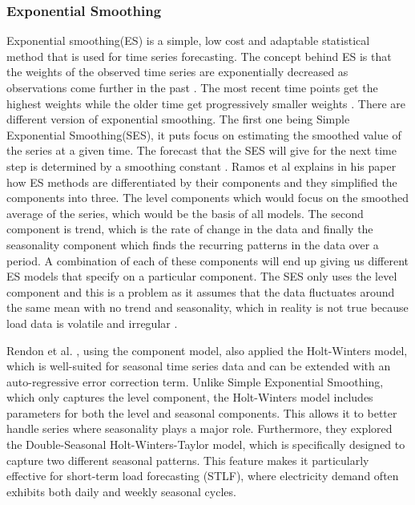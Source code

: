  
 
 \subsubsection{Exponential Smoothing }\label{sec:exponential smoothing}
 Exponential smoothing(ES) is a simple, low cost and adaptable statistical method that is used for time series forecasting. The concept behind ES is that the weights of the observed time series are exponentially decreased as observations come further in the past \cite{ramos2015performance}.
 The most recent time points get the highest weights while the older time get progressively smaller weights \cite{ramos2015performance}. There are different version of exponential smoothing. The first one being Simple Exponential Smoothing(SES), it puts focus on estimating the smoothed value of the series at a given time. The forecast that the SES will give for the next time step is determined by a smoothing constant \cite{ahmed2020review}. Ramos et al \cite{ramos2015performance} explains in his paper how ES methods are differentiated by their components and they simplified the components into three. The level components which would focus on the smoothed average of the series, which would be the basis of all models. The second component is trend, which is the rate of change in the data and finally the seasonality component which finds the recurring patterns in the data over a period. A combination of each of these components will end up giving us different ES models that specify on a particular component. The SES only uses the level component and this is a problem as it assumes that the data fluctuates around the same mean with no trend and seasonality, which in reality is not true because load data is volatile and irregular \cite{boopathy2024deep}.
 
Rendon et al. \cite{rendon2019structural}, using the component model, also applied the Holt-Winters model, which is well-suited for seasonal time series data and can be extended with an auto-regressive error correction term. Unlike Simple Exponential Smoothing, which only captures the level component, the Holt-Winters model includes parameters for both the level and seasonal components. This allows it to better handle series where seasonality plays a major role. Furthermore, they explored the Double-Seasonal Holt-Winters-Taylor model, which is specifically designed to capture two different seasonal patterns. This feature makes it particularly effective for short-term load forecasting (STLF), where electricity demand often exhibits both daily and weekly seasonal cycles.

